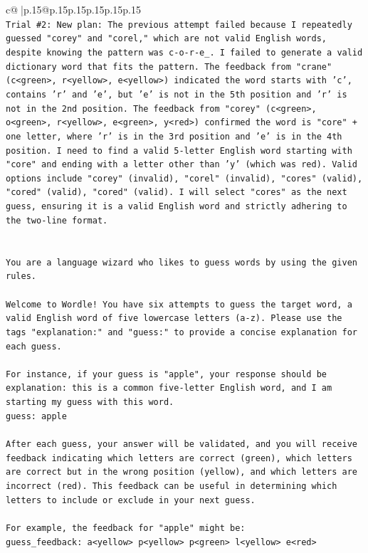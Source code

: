 \documentclass{article}
\begin{document}
{\begin{supertabular}{c@{$\;$}|p{.15\linewidth}@{}p{.15\linewidth}p{.15\linewidth}p{.15\linewidth}p{.15\linewidth}p{.15\linewidth}}
{{{\\ 
\texttt{Trial \#2: New plan: The previous attempt failed because I repeatedly guessed "corey" and "corel," which are not valid English words, despite knowing the pattern was c{-}o{-}r{-}e\_. I failed to generate a valid dictionary word that fits the pattern. The feedback from "crane" (c<green>, r<yellow>, e<yellow>) indicated the word starts with 'c', contains 'r' and 'e', but 'e' is not in the 5th position and 'r' is not in the 2nd position. The feedback from "corey" (c<green>, o<green>, r<yellow>, e<green>, y<red>) confirmed the word is "core" + one letter, where 'r' is in the 3rd position and 'e' is in the 4th position. I need to find a valid 5{-}letter English word starting with "core" and ending with a letter other than 'y' (which was red). Valid options include "corey" (invalid), "corel" (invalid), "cores" (valid), "cored" (valid), "cored" (valid). I will select "cores" as the next guess, ensuring it is a valid English word and strictly adhering to the two{-}line format.} \\
\\ 
\\ 
\texttt{You are a language wizard who likes to guess words by using the given rules.} \\
\\ 
\texttt{Welcome to Wordle! You have six attempts to guess the target word, a valid English word of five lowercase letters (a{-}z). Please use the tags "explanation:" and "guess:" to provide a concise explanation for each guess.} \\
\\ 
\texttt{For instance, if your guess is "apple", your response should be} \\
\texttt{explanation: this is a common five{-}letter English word, and I am starting my guess with this word.} \\
\texttt{guess: apple} \\
\\ 
\texttt{After each guess, your answer will be validated, and you will receive feedback indicating which letters are correct (green), which letters are correct but in the wrong position (yellow), and which letters are incorrect (red). This feedback can be useful in determining which letters to include or exclude in your next guess.} \\
\\ 
\texttt{For example, the feedback for "apple" might be:} \\
\texttt{guess\_feedback: a<yellow> p<yellow> p<green> l<yellow> e<red>} \\
}}}
\end{supertabular}}
\end{document}
